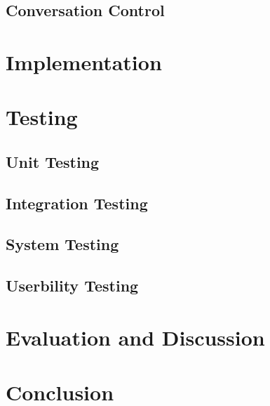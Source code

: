 \documentclass[11pt]{article}
\begin{document}
\subsection{Conversation Control} \label{conversation-control}

%

\section{Implementation} \label{implementation}

\section{Testing} \label{testing}

\subsection{Unit Testing} \label{unit-testing}

\subsection{Integration Testing} \label{integration-testing}

\subsection{System Testing} \label{system-testing}

\subsection{Userbility Testing} \label{usability-testing}


\section{Evaluation and Discussion} \label{evaluation-discussion}

\section{Conclusion} \label{conclusion}


%
 
\end{document}
